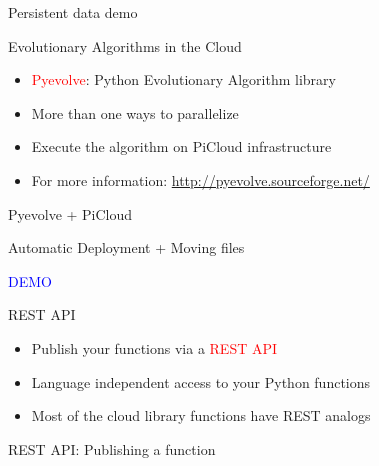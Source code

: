\documentclass{beamer} \usepackage{fancyvrb} \usepackage{listings}
\begin{document}
      \begin{frame}{Persistent data demo}
         
      \end{frame}

      \begin{frame}{Evolutionary Algorithms in the Cloud}
        \begin{itemize}
        \item \textcolor{red}{Pyevolve}: Python Evolutionary Algorithm library
        \item More than one ways to parallelize
        \item Execute the algorithm on PiCloud infrastructure
        \item For more information:
          \url{http://pyevolve.sourceforge.net/}
          
        \end{itemize}
      \end{frame}
      
      \begin{frame}{Pyevolve + PiCloud}
         
      \end{frame}

      \begin{frame}{Automatic Deployment + Moving files}
        \begin{center}
          \textcolor{blue}{DEMO}
        \end{center}
      \end{frame}



      \begin{frame}{REST API}
        \begin{itemize}
        \item Publish your functions via a \textcolor{red}{REST API}
        \item Language independent access to your Python functions
        \item Most of the cloud library functions have REST analogs
        \end{itemize}
      \end{frame}

      \begin{frame}{REST API: Publishing a function}
        
        
      \end{frame}
\end{document}

